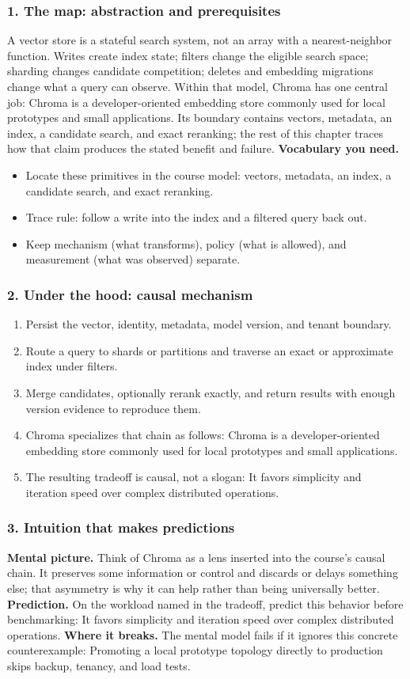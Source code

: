 \subsubsection*{1. The map: abstraction and prerequisites}
A vector store is a stateful search system, not an array with a nearest-neighbor function. Writes create index state; filters change the eligible search space; sharding changes candidate competition; deletes and embedding migrations change what a query can observe.
Within that model, Chroma has one central job: Chroma is a developer-oriented embedding store commonly used for local prototypes and small applications. Its boundary contains vectors, metadata, an index, a candidate search, and exact reranking; the rest of this chapter traces how that claim produces the stated benefit and failure.
\textbf{Vocabulary you need.}\begin{itemize}
\item Locate these primitives in the course model: vectors, metadata, an index, a candidate search, and exact reranking.
\item Trace rule: follow a write into the index and a filtered query back out.
\item Keep mechanism (what transforms), policy (what is allowed), and measurement (what was observed) separate.
\end{itemize}
\subsubsection*{2. Under the hood: causal mechanism}\begin{enumerate}
\item Persist the vector, identity, metadata, model version, and tenant boundary.
\item Route a query to shards or partitions and traverse an exact or approximate index under filters.
\item Merge candidates, optionally rerank exactly, and return results with enough version evidence to reproduce them.
\item Chroma specializes that chain as follows: Chroma is a developer-oriented embedding store commonly used for local prototypes and small applications.
\item The resulting tradeoff is causal, not a slogan: It favors simplicity and iteration speed over complex distributed operations.
\end{enumerate}
\subsubsection*{3. Intuition that makes predictions}
\textbf{Mental picture.} Think of Chroma as a lens inserted into the course's causal chain. It preserves some information or control and discards or delays something else; that asymmetry is why it can help rather than being universally better.
\textbf{Prediction.} On the workload named in the tradeoff, predict this behavior before benchmarking: It favors simplicity and iteration speed over complex distributed operations.
\textbf{Where it breaks.} The mental model fails if it ignores this concrete counterexample: Promoting a local prototype topology directly to production skips backup, tenancy, and load tests.
